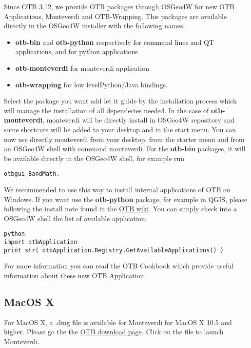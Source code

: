 Since OTB 3.12, we provide OTB packages through OSGeo4W for new OTB Applications, Monteverdi and 
OTB-Wrapping. This packages are available directly in the OSGeo4W installer with the following names:
\begin{itemize}
\item \textbf{otb-bin} and \textbf{otb-python} respectively for command lines and QT applications, and for python applications
\item \textbf{otb-monteverdi} for monteverdi application 
\item \textbf{otb-wrapping} for low levelPython/Java bindings.
\end{itemize}
Select the package you want add let it guide by the installation process which will manage the installation of all dependecies needed.
In the case of \textbf{otb-monteverdi}, monteverdi will be directly install in OSGeo4W repository and some shortcuts will be added to your desktop 
and in the start menu. You can now use directly monteverdi from your desktop, from the starter menu and from an OSGeo4W shell with command monteverdi. 
For the \textbf{otb-bin} packages, it will be available directly in the OSGeo4W shell, for example run 
\begin{verbatim}
otbgui_BandMath.
\end{verbatim}
 We recommended to use this way to install internal applications of OTB on Windows. 
If you want use the \textbf{otb-python} package, for example in QGIS, please following the install note found in the \href{http://wiki.orfeo-toolbox.org/index.php/Quantum_GIS_access_to_OTB_applications#Notes_for_Windows_users}{OTB wiki}. You can simply check into a OSGeo4W shell the list of available application:
\begin{verbatim}
python
import otbApplication
print str( otbApplication.Registry.GetAvailableApplications() )
\end{verbatim}
For more information you can read the OTB Cookbook which provide useful information about these new OTB Application. 

\subsection{MacOS X}
\label{ssec:mac_binaries}

For MacOS X, a .dmg file is available for Monteverdi for MacOS X 10.5 and higher. 
Please go the the \href{http://sourceforge.net/projects/orfeo-toolbox/}{OTB download page}.
Click on the file to launch Monteverdi.

